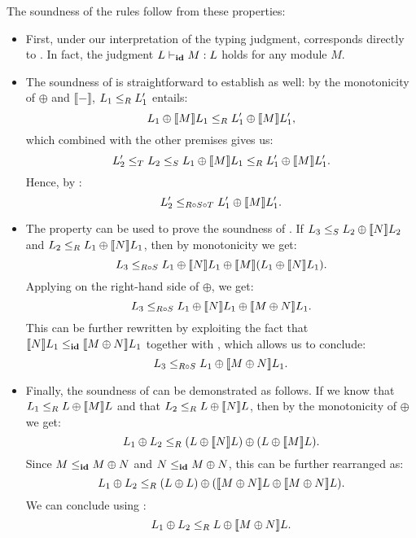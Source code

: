 The soundness of the rules
follow from these properties:
\begin{itemize}

\item First,
    under our interpretation of the typing judgment,
     corresponds directly to .
    In fact, the judgment $L \vdash_{\textbf{id}} M : L$
    holds for any module $M$.

\item The soundness of  is
    straightforward to establish as well:
    by the monotonicity of  $\oplus$ and $\llbracket - \rrbracket$,
    $L_1 \le_{R} L_1'$ entails:
    \[ L_1  \oplus \llbracket M \rrbracket L_1 \le_{R}
       L_1' \oplus \llbracket M \rrbracket L_1', \]
    which combined with the other premises gives us:
    \[ L_2' \le_{T} L_2 \le_{S}
       L_1  \oplus \llbracket M \rrbracket L_1 \le_{R}
       L_1' \oplus \llbracket M \rrbracket L_1'. \]
    Hence, by :
    \[ L_2' \le_{R \circ S \circ T} L_1' \oplus \llbracket M \rrbracket L_1'. \]

\item The property  can be used to prove
    the soundness of .
    If $L_3 \le_{S} L_2 \oplus \llbracket N \rrbracket L_2$ and
    $L_2 \le_{R} L_1 \oplus \llbracket N \rrbracket L_1$,
    then by monotonicity we get:
    \[ L_3 \le_{R \circ S} L_1 \oplus \llbracket N \rrbracket L_1 \oplus
      \llbracket M \rrbracket (L_1 \oplus \llbracket N \rrbracket L_1). \]
    Applying 
    on the right-hand side of $\oplus$, we get:
    \[ L_3 \le_{R \circ S} L_1 \oplus \llbracket N \rrbracket L_1
                           \oplus \llbracket M \oplus N \rrbracket L_1. \]
    This can be further rewritten by exploiting the fact that
    $\llbracket N \rrbracket L_1 \le_{\textbf{id}}
     \llbracket M \oplus N \rrbracket L_1$
    together with ,
    which allows us to conclude:
    \[ L_3 \le_{R \circ S} L_1 \oplus \llbracket M \oplus N \rrbracket L_1. \]

\item Finally, the soundness of  can be demonstrated as follows.
    If we know that $L_1 \le_{R} L \oplus \llbracket M \rrbracket L$
    and that $L_2 \le_{R} L \oplus \llbracket N \rrbracket L$,
    then by the monotonicity of $\oplus$ we get:
    \[ L_1 \oplus L_2 \le_{R} (L \oplus \llbracket N \rrbracket L)
                         \oplus (L \oplus \llbracket M \rrbracket L). \]
    Since $M \le_{\textbf{id}} M \oplus N$
    and $N \le_{\textbf{id}} M \oplus N$,
    this can be further rearranged as:
    \[ L_1 \oplus L_2 \le_{R} (L \oplus L) \oplus
        (\llbracket M \oplus N \rrbracket L \oplus
         \llbracket M \oplus N \rrbracket L). \]
    We can conclude using :
    \[ L_1 \oplus L_2 \le_{R} L \oplus \llbracket M \oplus N \rrbracket L. \]
\end{itemize}

